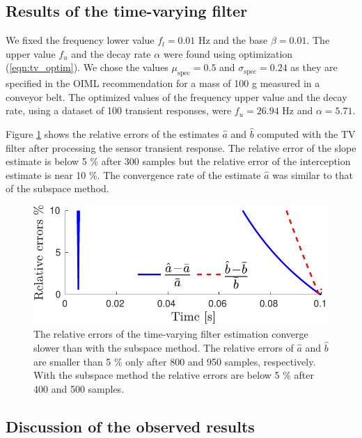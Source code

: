 \subsection{Results of the time-varying filter}

We fixed the frequency lower value $f_l=0.01$ Hz and the base $\beta = 0.01$. 
The upper value $f_u$ and the decay rate $\alpha$ were found using optimization (\ref{eqn:tv_optim}). 
We chose the values $\mu_{\mathrm{spec}}=0.5$ and $\sigma_{\mathrm{spec}}=0.24$ as they are specified in the OIML recommendation \citep{OIML_R51_1} for a mass of 100 g measured in a conveyor belt.
The optimized values of the frequency upper value and the decay rate, using a dataset of 100 transient responses, were $f_u = 26.94$ Hz and $\alpha = 5.71$.

Figure \ref{fig:rele_tv_40dB_s1} shows the relative errors of the estimates $\widehat{a}$ and $\widehat{b}$ computed with the TV filter after processing the sensor transient response.
The relative error of the slope estimate is below 5 \% after 300 samples but the relative error of the interception estimate is near 10 \%.
The convergence rate of the estimate $\widehat{a}$ was similar to that of the subspace method.

\begin{figure}[!htbp]
\centering
\includegraphics[width=1\columnwidth]{./ChapterRampInput/fig/Fig_9.pdf} 
\caption{ \label{fig:rele_tv_40dB_s1} The relative errors of the time-varying filter estimation converge slower than with the subspace method. 
The relative errors of $\widehat{a}$ and $\widehat{b}$ are smaller than 5 \% only after 800 and 950 samples, respectively.
With the subspace method the relative errors are below 5 \% after 400 and 500 samples. }
\end{figure}



\subsection{Discussion of the observed results}

